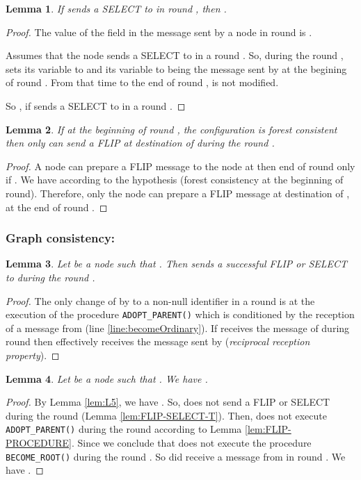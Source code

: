 \documentclass[twocolumn]{article}
\newtheorem{lemma}{Lemma}
\newcommand{\depends}[1]{}
\begin{document}
\begin{lemma}
\label{lem:select-score}
If  sends a SELECT to  in round , then 
.
\end{lemma}

\begin{proof}
The value of the  field in the message sent by a node  in round  
is .


Assumes that the node   sends a SELECT to  in a round .
So, during the round ,  sets its  variable to  and its  
variable to 
 being the message sent by  at the begining of round .
From that time to the end of round ,  is not modified.

So , if  sends 
a SELECT to  in a round .
 \end{proof}



\begin{lemma}
  \label{lem:cond-single-Flip}
If at the beginning of round , the configuration 
is forest  consistent then only 
 can  send a FLIP at destination of  during the round .
\depends{\ref{th:consistency}}
\end{lemma}

\begin{proof}
A node  can prepare a FLIP message to the node  
at then end of round  only if .
We have  according to the hypothesis (forest consistency at the beginning of round). 
Therefore, only the node   can prepare 
a FLIP message at destination of , 
at the end of round .
 \end{proof}



\subsubsection{Graph consistency:}
\begin{lemma}
  \label{lem:add_parent}
Let  be a node such that .
Then  sends a successful FLIP or SELECT to  during the round .
\end{lemma}
\begin{proof}
The only change of  by  to a non-null identifier  in 
a round  is at the execution of the procedure \texttt{ADOPT\_PARENT()} 
which is conditioned by the reception of a message from  (line \ref{line:becomeOrdinary}).
If  receives the message of  during round  then  effectively receives the
message sent by  (\textit{reciprocal reception property}).
\end{proof}


\begin{lemma}
  \label{lem:keep_parent}
Let  be a node such that .
We have .
\end{lemma}
\begin{proof}
By Lemma \ref{lem:L5}, we have .
So,  does not send a FLIP or SELECT during the round  
(Lemma \ref{lem:FLIP-SELECT-T}).
Then,  does not execute \texttt{ADOPT\_PARENT()} during the round 
according to Lemma  \ref{lem:FLIP-PROCEDURE}.
Since  we conclude that
 does not execute the procedure \texttt{BECOME\_ROOT()} during the round .
So  did receive a message from  in round .
We have .
 \end{proof}
\end{document}
